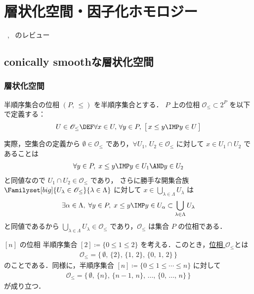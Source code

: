 \documentclass[TQFT_main]{subfiles}
\begin{document}
\chapter{層状化空間・因子化ホモロジー}

~\cite{AFT2014stratified}, ~\cite{AFT2014FH}のレビュー

\section{conically smoothな層状化空間}

\subsection{層状化空間}

\begin{mydef}[label=def:topo-poset]{半順序集合の位相}
    $(P,\, \le)$ を半順序集合とする．
    $P$ 上の位相 $\mathscr{O}_{\le} \subset 2^P$ を以下で定義する：
    \begin{align}
        U \in \mathscr{O}_{\le} \DEF \forall x \in U,\, \forall y \in P,\; \bigl[\, x \le y \IMP y \in U \,\bigr]
    \end{align}
\end{mydef}

実際，空集合の定義から $\emptyset \in \mathscr{O}_{\le}$ であり，$\forall U_1,\, U_2 \in \mathcal{O}_{\le}$ に対して $x \in U_1 \cap U_2$ であることは
\begin{align}
     \forall y \in P,\; x \le y \IMP y \in U_1 \AND y \in U_2
\end{align}
と同値なので $U_1 \cap U_2 \in \mathscr{O}_{\le}$ であり，
さらに勝手な開集合族 $\Familyset[big]{U_\lambda \in \mathscr{O}_{\le}}{\lambda \in \Lambda}$ に対して
$x \in \bigcup_{\lambda \in \Lambda} U_\lambda$ は
\begin{align}
    \exists \alpha \in \Lambda,\; \forall y \in P,\; x \le y \IMP y \in U_\alpha \subset \bigcup_{\lambda \in \Lambda} U_\lambda 
\end{align}
と同値であるから $\bigcup_{\lambda \in \Lambda} U_\lambda \in \mathscr{O}_{\le}$ であり，$\mathscr{O}_{\le}$ は集合 $P$ の位相である．

\begin{myexample}[label=ex:topo-poset]{{$[n]$} の位相}
    半順序集合 $[2] \coloneqq \{0 \le 1 \le 2\}$ を考える．このとき，\hyperref[def:topo-poset]{位相 $\mathscr{O}_{\le}$}とは
    \begin{align}
        \mathscr{O}_{\le} = \bigl\{\, \emptyset,\, \{2\},\, \{1,\, 2\},\, \{0,\, 1,\, 2\} \,\bigr\} 
    \end{align}
    のことである．同様に，半順序集合 $[n] \coloneqq \{0 \le 1 \le \cdots \le n\}$ に対して
    \begin{align}
        \mathscr{O}_{\le} = \bigl\{\, \emptyset,\, \{n\},\, \{n-1,\, n\},\, \dots,\, \{0,\, \dots,\, n\}  \,\bigr\}
    \end{align}
    が成り立つ．
\end{myexample}
\end{document}
